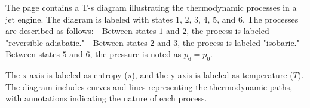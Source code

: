 The page contains a T-s diagram illustrating the thermodynamic processes in a jet engine. The diagram is labeled with states \(1\), \(2\), \(3\), \(4\), \(5\), and \(6\). The processes are described as follows:  
- Between states \(1\) and \(2\), the process is labeled "reversible adiabatic."  
- Between states \(2\) and \(3\), the process is labeled "isobaric."  
- Between states \(5\) and \(6\), the pressure is noted as \(p_6 = p_0\).  

The x-axis is labeled as entropy (\(s\)), and the y-axis is labeled as temperature (\(T\)). The diagram includes curves and lines representing the thermodynamic paths, with annotations indicating the nature of each process.
